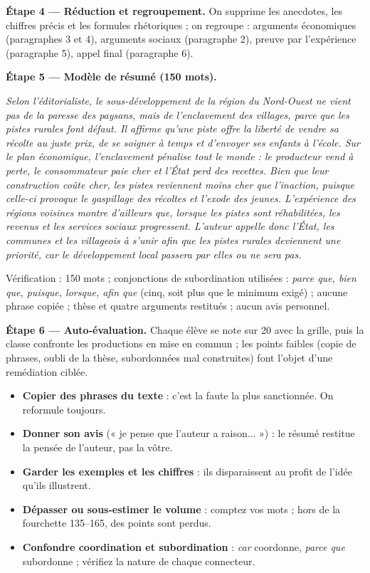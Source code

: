 \documentclass[11pt]{article}
\begin{document}
\begin{exoresolu}
\textbf{Étape 4 — Réduction et regroupement.} On supprime les anecdotes, les chiffres précis et les formules rhétoriques ; on regroupe : arguments économiques (paragraphes 3 et 4), arguments sociaux (paragraphe 2), preuve par l'expérience (paragraphe 5), appel final (paragraphe 6).

\textbf{Étape 5 — Modèle de résumé (150 mots).}

\emph{Selon l'éditorialiste, le sous-développement de la région du Nord-Ouest ne vient pas de la paresse des paysans, mais de l'enclavement des villages, parce que les pistes rurales font défaut. Il affirme qu'une piste offre la liberté de vendre sa récolte au juste prix, de se soigner à temps et d'envoyer ses enfants à l'école. Sur le plan économique, l'enclavement pénalise tout le monde : le producteur vend à perte, le consommateur paie cher et l'État perd des recettes. Bien que leur construction coûte cher, les pistes reviennent moins cher que l'inaction, puisque celle-ci provoque le gaspillage des récoltes et l'exode des jeunes. L'expérience des régions voisines montre d'ailleurs que, lorsque les pistes sont réhabilitées, les revenus et les services sociaux progressent. L'auteur appelle donc l'État, les communes et les villageois à s'unir afin que les pistes rurales deviennent une priorité, car le développement local passera par elles ou ne sera pas.}

Vérification : 150 mots ; conjonctions de subordination utilisées : \emph{parce que, bien que, puisque, lorsque, afin que} (cinq, soit plus que le minimum exigé) ; aucune phrase copiée ; thèse et quatre arguments restitués ; aucun avis personnel.

\textbf{Étape 6 — Auto-évaluation.} Chaque élève se note sur 20 avec la grille, puis la classe confronte les productions en mise en commun ; les points faibles (copie de phrases, oubli de la thèse, subordonnées mal construites) font l'objet d'une remédiation ciblée.
\end{exoresolu}

\begin{attention}
\begin{itemize}
\item \textbf{Copier des phrases du texte} : c'est la faute la plus sanctionnée. On reformule toujours.
\item \textbf{Donner son avis} (« je pense que l'auteur a raison... ») : le résumé restitue la pensée de l'auteur, pas la vôtre.
\item \textbf{Garder les exemples et les chiffres} : ils disparaissent au profit de l'idée qu'ils illustrent.
\item \textbf{Dépasser ou sous-estimer le volume} : comptez vos mots ; hors de la fourchette 135--165, des points sont perdus.
\item \textbf{Confondre coordination et subordination} : \emph{car} coordonne, \emph{parce que} subordonne ; vérifiez la nature de chaque connecteur.
\end{itemize}
\end{attention}
\end{document}
